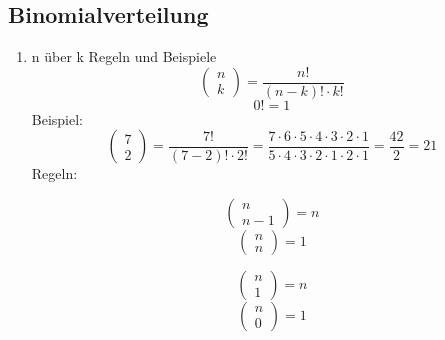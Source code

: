 \documentclass[a4paper, 15pt]{article}
\begin{document}
\subsection{Binomialverteilung}
\begin{enumerate}
\item n über k Regeln und Beispiele
\begin{equation*}
\left(\begin{array}{c} n\\k \end{array}\right) = \dfrac{n!}{(n-k)!\cdot k!}
\end{equation*}
\begin{equation*}
0! = 1
\end{equation*}
Beispiel:
\begin{equation*}
\left(\begin{array}{c} 7\\2 \end{array}\right) = \dfrac{7!}{(7-2)!\cdot 2!} = \dfrac{7\cdot6\cdot5\cdot4\cdot3\cdot2\cdot1}{5\cdot4\cdot3\cdot2\cdot1\cdot2\cdot1} = \dfrac{42}{2} = 21
\end{equation*}
Regeln:\\
\begin{minipage}{.45\textwidth}
\begin{equation*}
\left(\begin{array}{c} n\\n-1 \end{array}\right) = n
\end{equation*}
\begin{equation*}
\left(\begin{array}{c} n\\n \end{array}\right) = 1
\end{equation*}
\end{minipage}
\hspace{1cm}
\begin{minipage}{.45\textwidth}
\begin{equation*}
\left(\begin{array}{c} n\\1 \end{array}\right) = n
\end{equation*}
\begin{equation*}
\left(\begin{array}{c} n\\0 \end{array}\right) = 1
\end{equation*}

\end{minipage}
\end{enumerate}
\end{document}

